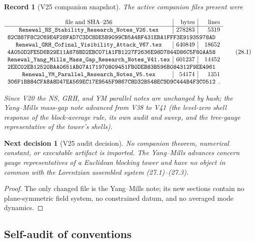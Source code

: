 \documentclass[11pt]{article}
\newtheorem{decision}[theorem]{Next decision}
\newtheorem{record}[theorem]{Record}
\theoremstyle{remark}
\begin{document}
\begin{record}[V25 companion snapshot]
\label{rec:v20v25-snapshot}
The active companion files present were

\[
\begin{array}{c|r|r}
\hbox{file and SHA--256}&\hbox{bytes}&\hbox{lines}\\ \hline
\texttt{Renewal\_NS\_Stability\_Research\_Notes\_V26.tex}
&278283&5319\\
\multicolumn{3}{l}{
\texttt{82C887F8C2C69E4F28FAD7C3DC8DE5B9099CB5A4BF431EBA1FFF3E91935978AD}}
\\
\texttt{Renewal\_GRH\_Cofinal\_Visibility\_Attack\_V67.tex}
&640849&18652\\
\multicolumn{3}{l}{
\texttt{4A050D2FE5D6B29E11A878BD2EBC071A1FB1227F2636E98D7844D86C5F80AA58}}
\\
\texttt{Renewal\_Yang\_Mills\_Mass\_Gap\_Research\_Notes\_V41.tex}
&601237&14452\\
\multicolumn{3}{l}{
\texttt{2EEC02EB12520BAA0651AB07A171970809451FB0DEB83B596B084312F9EE4961}}
\\
\texttt{Renewal\_YM\_Parallel\_Research\_Notes\_V5.tex}
&54174&1351\\
\multicolumn{3}{l}{
\texttt{306F1BB84CFA8A8D47EA569EC17E9545F9867C8D32B548EC9D9C444B4F3C0512}}.
\end{array}                                                     \tag{28.1}
\]

Since V20 the NS, GRH, and YM parallel notes are unchanged by hash;
the Yang--Mills mass-gap note advanced from V38 to V41 (the
level-zero shell response of the block-average rule, its own audit
and sweep, and the tree-gauge representative of the tower's shells).
\end{record}

\begin{decision}[V25 audit decision]
\label{dec:v20v25-audit}
No companion theorem, numerical constant, or executable artifact is
imported.  The Yang--Mills advances concern gauge representatives of
a Euclidean blocking tower and have no object in common with the
Lorentzian assembled system (27.1)--(27.3).
\end{decision}

\begin{proof}
The only changed file is the Yang--Mills note; its new sections
contain no plane-symmetric field system, no constrained datum, and
no averaged mode dynamics.
\end{proof}

\subsection{Self-audit of conventions}
\end{document}
